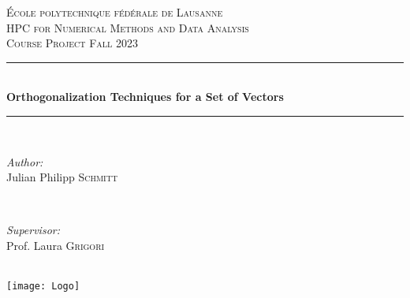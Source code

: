 \begin{titlepage}
\newcommand{\HRule}{\rule{\linewidth}{0.5mm}} %

\center %


\vspace{3cm}
\textsc{\LARGE École polytechnique fédérale de Lausanne}\\[1.5cm] %
\textsc{\Large HPC for Numerical Methods and Data Analysis}\\[0.5cm] %
\textsc{\large Course Project Fall 2023}\\[0.5cm] %


\HRule \\[0.4cm] %
{ \huge \bfseries Orthogonalization Techniques for a Set of Vectors}\\[0.4cm] %
\HRule \\[1.5cm]


\begin{minipage}{0.4\textwidth}
\begin{flushleft} \large
\emph{Author:}\\
Julian Philipp \textsc{Schmitt} %
\end{flushleft}
\end{minipage}
~
\begin{minipage}{0.4\textwidth}
\begin{flushright} \large
\emph{Supervisor:} \\
Prof. Laura \textsc{Grigori} %
\end{flushright}
\end{minipage}\\[10cm]


\texttt{[image: Logo]}\\[1cm] %


\vfill %

\end{titlepage}
